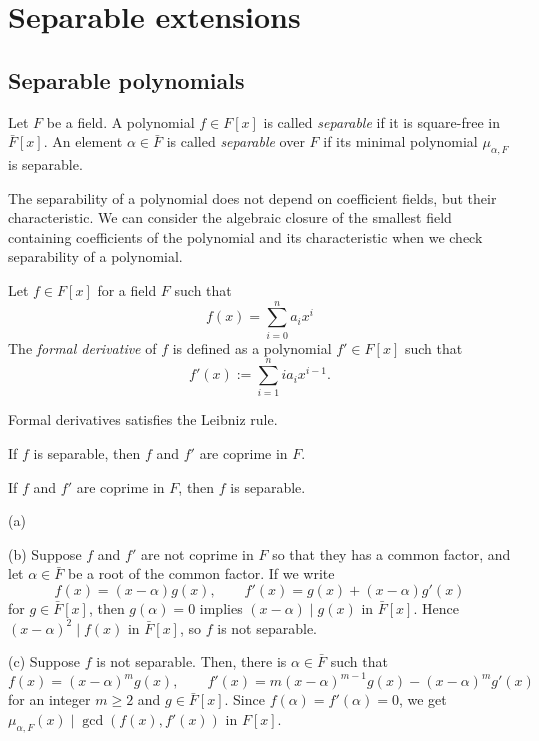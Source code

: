 \documentclass{../note}
\begin{document}
\chapter{Separable extensions}

\section{Separable polynomials}
\begin{defn}
Let $F$ be a field.
A polynomial $f\in F[x]$ is called \emph{separable} if it is square-free in $\bar F[x]$.
An element $\alpha\in\bar F$ is called \emph{separable} over $F$ if its minimal polynomial $\mu_{\alpha,F}$ is separable.
\end{defn}

The separability of a polynomial does not depend on coefficient fields, but their characteristic.
We can consider the algebraic closure of the smallest field containing coefficients of the polynomial and its characteristic when we check separability of a polynomial.

\begin{prb}
Let $f\in F[x]$ for a field $F$ such that
\[f(x)=\sum_{i=0}^na_ix^i\]
The \emph{formal derivative} of $f$ is defined as a polynomial $f'\in F[x]$ such that
\[f'(x):=\sum_{i=1}^nia_ix^{i-1}.\]
\begin{parts}
\item Formal derivatives satisfies the Leibniz rule.
\item If $f$ is separable, then $f$ and $f'$ are coprime in $F$.
\item If $f$ and $f'$ are coprime in $F$, then $f$ is separable.
\end{parts}
\end{prb}
\begin{pf}
(a)

(b)
Suppose $f$ and $f'$ are not coprime in $F$ so that they has a common factor, and let $\alpha\in\bar F$ be a root of the common factor.
If we write
\[f(x)=(x-\alpha)g(x),\qquad f'(x)=g(x)+(x-\alpha)g'(x)\]
for $g\in\bar F[x]$, then $g(\alpha)=0$ implies $(x-\alpha)\mid g(x)$ in $\bar F[x]$.
Hence $(x-\alpha)^2\mid f(x)$ in $\bar F[x]$, so $f$ is not separable.

(c)
Suppose $f$ is not separable.
Then, there is $\alpha\in\bar F$ such that
\[f(x)=(x-\alpha)^mg(x),\qquad f'(x)=m(x-\alpha)^{m-1}g(x)-(x-\alpha)^mg'(x)\]
for an integer $m\ge2$ and $g\in\bar F[x]$.
Since $f(\alpha)=f'(\alpha)=0$, we get $\mu_{\alpha,F}(x)\mid\gcd(f(x),f'(x))$ in $F[x]$.
\end{pf}
\end{document}

